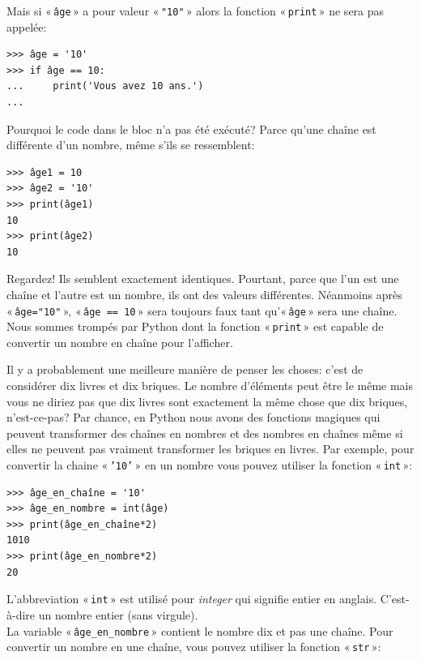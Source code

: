 Mais si « \texttt{âge} »  a pour valeur « \texttt{"10"} » alors la fonction « \texttt{print} » ne sera pas appelée:

\begin{Verbatim}[frame=single,rulecolor=\color{green}, label=à taper avec attention]
>>> âge = '10'
>>> if âge == 10:
...     print('Vous avez 10 ans.')
...
\end{Verbatim}

Pourquoi le code dans le bloc n'a pas été exécuté? Parce qu'une chaîne est différente d'un nombre, même s'ils se ressemblent:

\begin{Verbatim}[frame=single,rulecolor=\color{mbleu}, label=à taper]
>>> âge1 = 10
>>> âge2 = '10'
>>> print(âge1)
10
>>> print(âge2)
10
\end{Verbatim}

Regardez! Ils semblent exactement identiques. Pourtant, parce que l'un est une chaîne et l'autre est un nombre, ils ont des valeurs différentes. Néanmoins après « \texttt{âge="10"} », « \texttt{âge == 10} »  sera toujours faux tant qu'« \texttt{âge} » sera une chaîne.  Nous sommes trompés par Python dont la fonction « \texttt{print} » est capable de convertir un nombre en chaîne pour l'afficher.

Il y a probablement une meilleure manière de penser les choses: c'est de considérer dix livres et dix briques. Le nombre d'éléments peut être le même mais vous ne diriez pas que dix livres sont exactement la même chose que dix briques, n'est-ce-pas? Par chance, en Python nous avons des fonctions magiques qui peuvent transformer des chaînes en nombres et des nombres en chaînes même si elles ne peuvent pas vraiment transformer les briques en livres. Par exemple, pour convertir la chaine « \texttt{'10'} »  en un nombre vous pouvez utiliser la fonction « \texttt{int} »: 

\begin{Verbatim}[frame=single,rulecolor=\color{mbleu}, label=à taper]
>>> âge_en_chaîne = '10'
>>> âge_en_nombre = int(âge)
>>> print(âge_en_chaîne*2)
1010
>>> print(âge_en_nombre*2)
20
\end{Verbatim}

L'abbreviation « \texttt{int} »  est utilisé  pour \emph{integer} qui signifie entier en anglais. C'est-à-dire un nombre entier (sans virgule).\\

La variable « \texttt{âge\_en\_nombre} » contient le nombre dix et pas une chaîne. Pour convertir un nombre en une chaîne, vous pouvez utiliser la fonction « \texttt{str} »:



